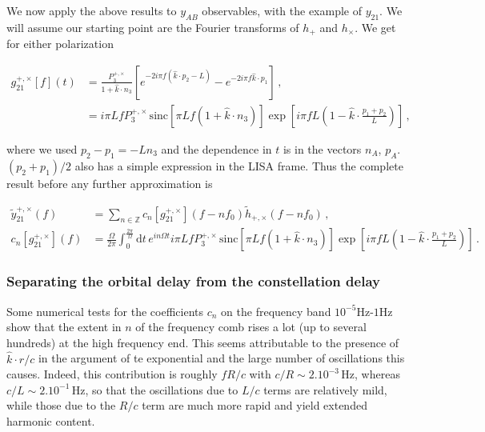 \documentclass[aps,showpacs,%
prd,superscriptaddress,nofootinbib]{revtex4}
\newcommand\ud{{\mathrm{d}}}
\newcommand{\nn}{\nonumber}
\newcommand{\hatk}{\hat{k}}
\newcommand{\Hz}{\,\mathrm{Hz}}
\newcommand{\sinc}{\,\mathrm{sinc}}
\begin{document}
We now apply the above results to $y_{AB}$ observables, with the example of $y_{21}$. We will assume our starting point are the Fourier transforms of $h_{+}$ and $h_{\times}$. We get for either polarization
%
\begin{widetext}
\begin{align}
	g_{21}^{+,\times}[f](t) &= \frac{P_{3}^{+,\times}}{1+\hatk\cdot n_{3}} \left[ e^{-2i\pi f (\hatk\cdot p_{2} - L)} - e^{-2i\pi f \hatk\cdot p_{1}} \right] \,, \nn\\
	&= i\pi L f P_{3}^{+,\times} \sinc\left[ \pi L f(1+\hatk \cdot n_{3})\right]\exp\left[ i \pi f L \left(  1 - \hatk \cdot \frac{p_{1}+p_{2}}{L}\right) \right] \,,
\end{align}
\end{widetext}
%
where we used $p_{2}-p_{1} = -L n_{3}$ and the dependence in $t$ is in the vectors $n_{A}$, $p_{A}$. $(p_{2}+p_{1})/2 $ also has a simple expression in the LISA frame. Thus the complete result before any further approximation is
%
\begin{widetext}
\begin{subequations}
\begin{align}
	\tilde{y}_{21}^{+,\times}(f) &= \sum\limits_{n\in \mathbb{Z}} c_{n}[g_{21}^{+,\times}]\left(f - n f_{0}\right) \tilde{h}_{+,\times}\left(f - n f_{0}\right)\,, \\
	c_{n}[g_{21}^{+,\times}]\left(f\right) &= \frac{\Omega}{2\pi}\int_{0}^{\frac{2\pi}{\Omega}} \ud t \, e^{i n \Omega t} i\pi L f P_{3}^{+,\times} \sinc\left[ \pi L f(1+\hatk \cdot n_{3})\right]\exp\left[ i \pi f L \left(  1 - \hatk \cdot \frac{p_{1}+p_{2}}{L}\right) \right]  \,.
\end{align}
\end{subequations}
\end{widetext}
%


\subsubsection*{Separating the orbital delay from the constellation delay}

Some numerical tests for the coefficients $c_{n}$ on the frequency band $10^{-5}$Hz-$1$Hz show that the extent in $n$ of the frequency comb rises a lot (up to several hundreds) at the high frequency end. This seems attributable to the presence of $\hatk\cdot r/c$ in the argument of te exponential and the large number of oscillations this causes. Indeed, this contribution is roughly $f R/c$ with $c/R\sim 2.10^{-3}\Hz$, whereas $c/L\sim 2.10^{-1}\Hz$, so that the oscillations due to $L/c$ terms are relatively mild, while those due to the $R/c$ term are much more rapid and yield extended harmonic content.
\end{document}
